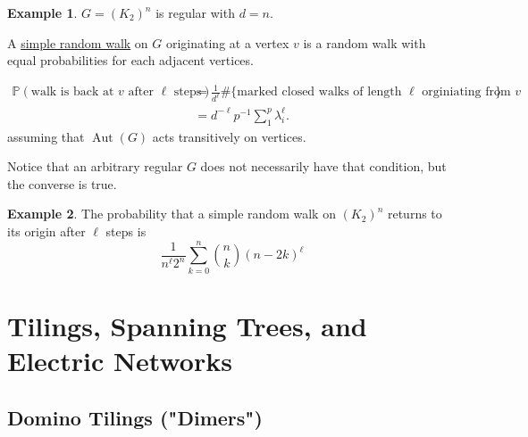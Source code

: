 \documentclass{report}
\newcommand{\matP}{\mathbb{P}}
\def \Aut {\operatorname{Aut}}
\theoremstyle{definition}
\newtheorem{example}{Example}[section]
\theoremstyle{remark}
\numberwithin{equation}{section}
\begin{document}
\begin{example}
$G = (K_2)^n$ is regular with $d = n.$
\end{example}

A \underline{simple random walk} on $G$ originating at a vertex $v$ is a random walk with equal probabilities for each adjacent vertices.

\begin{align*}
\matP\left(\text{walk is back at $v$ after $\ell$ steps}\right) & = \frac{1}{d^\ell} \#\{\text{marked closed walks of length $\ell$ orginiating from $v$}\} \\
& = d^{-\ell} p^{-1} \sum_1^p \lambda_i^\ell.
\end{align*}
assuming that $\Aut(G)$ acts transitively on vertices.

Notice that an arbitrary regular $G$ does not necessarily have that condition, but the converse is true.

\begin{example}
The probability that a simple random walk on $(K_2)^n$ returns to its origin after $\ell $ steps is
\[
\frac{1}{n^\ell 2^n} \sum_{k = 0}^n {n \choose k} (n - 2k)^\ell
\]
\end{example}


\chapter{Tilings, Spanning Trees, and Electric Networks}
\section{Domino Tilings ("Dimers")}
\end{document}
